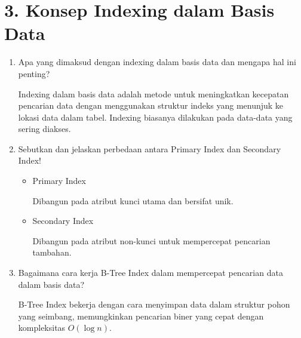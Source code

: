 \documentclass[a4paper,11pt]{article}
\begin{document}
\section*{3. Konsep Indexing dalam Basis Data}
\begin{enumerate}[label=\alph*.]
    \item Apa yang dimaksud dengan indexing dalam basis data dan mengapa hal ini penting?

      Indexing dalam basis data adalah metode untuk meningkatkan kecepatan
      pencarian data dengan menggunakan struktur indeks yang menunjuk
      ke lokasi data dalam tabel. Indexing biasanya dilakukan pada data-data yang
      sering diakses.

    \item Sebutkan dan jelaskan perbedaan antara Primary Index dan Secondary Index!

    \begin{itemize}

        \item Primary Index

          Dibangun pada atribut kunci utama dan bersifat unik.

        \item Secondary Index

          Dibangun pada atribut non-kunci untuk mempercepat pencarian tambahan.

    \end{itemize}

    \item Bagaimana cara kerja B-Tree Index dalam mempercepat pencarian data dalam basis data?

      B-Tree Index bekerja dengan cara menyimpan data dalam struktur pohon
      yang seimbang, memungkinkan pencarian biner yang cepat dengan
      kompleksitas \(O(\log n)\).

\end{enumerate}
\end{document}
